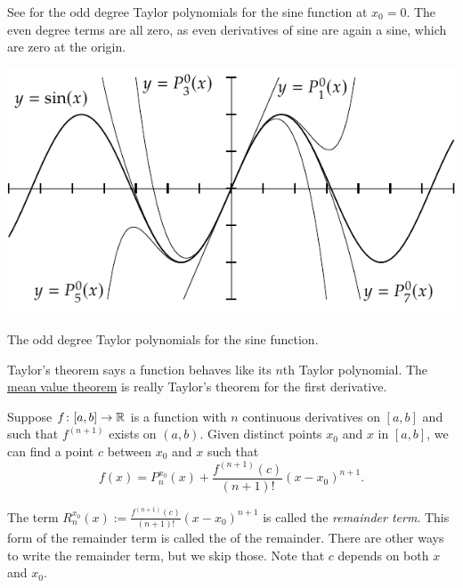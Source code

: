 See  for
the odd degree Taylor polynomials for the sine function at $x_0=0$.
The even degree terms are all zero, as even derivatives 
of sine are again a sine, which are zero at the origin.
\begin{myfigureht}
\includegraphics{figures/taylorsin}
\caption{The odd degree Taylor polynomials for the sine
function.\label{fig:taylorsin}}
\end{myfigureht}

Taylor's theorem says a function behaves like its $n$th
Taylor polynomial.  The 
\hyperref[thm:mvt]{mean value theorem} is really Taylor's theorem
for the first derivative.

\begin{thm}[Taylor] \label{thm:taylor}
Suppose $f \colon [a,b] \to {\mathbb{R}}$ is a function with $n$ continuous
derivatives on $[a,b]$ and such that $f^{(n+1)}$ exists on $(a,b)$.
Given distinct points $x_0$ and $x$ in $[a,b]$,
we can find a point $c$ between $x_0$
and $x$ such that
\begin{equation*}
f(x)=P_{n}^{x_0}(x)+\frac{f^{(n+1)}(c)}{(n+1)!}{(x-x_0)}^{n+1} .
\end{equation*}
\end{thm}

The term $R_n^{x_0}(x):=\frac{f^{(n+1)}(c)}{(n+1)!}{(x-x_0)}^{n+1}$ is called the
\emph{remainder term}.  This
form 
of the remainder term is called the
\emph{} of the remainder.  There are other ways
to write the remainder term, but we skip those.  Note that $c$ depends on
both $x$ and $x_0$.

